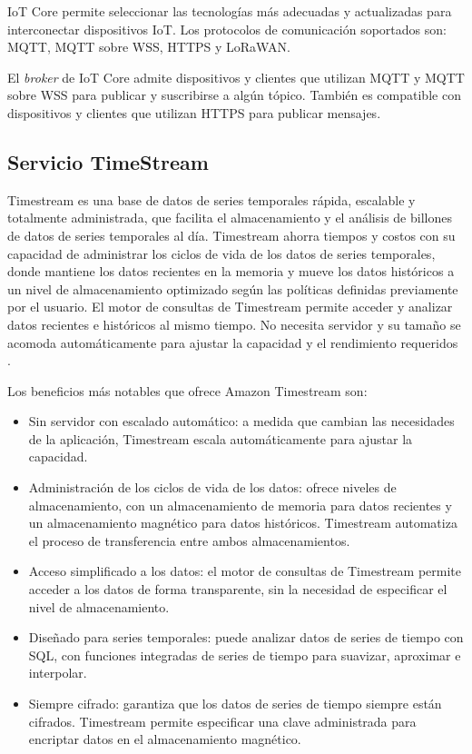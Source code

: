 IoT Core permite seleccionar las tecnologías más adecuadas y actualizadas para interconectar dispositivos IoT. Los protocolos de comunicación soportados son: MQTT, MQTT sobre WSS, HTTPS y LoRaWAN.

El \textit{broker} de IoT Core admite dispositivos y clientes que utilizan MQTT y MQTT sobre WSS para publicar y suscribirse a algún tópico. También es compatible con dispositivos y clientes que utilizan HTTPS para publicar mensajes.

\subsection{Servicio TimeStream}
Timestream es una base de datos de series temporales rápida, escalable y totalmente administrada, que facilita el almacenamiento y el análisis de billones de datos de series temporales al día. Timestream ahorra tiempos y costos con su capacidad de administrar los ciclos de vida de los datos de series temporales, donde mantiene los datos recientes en la memoria y mueve los datos históricos a un nivel de almacenamiento optimizado según las políticas definidas previamente por el usuario. El motor de consultas de Timestream permite acceder y analizar datos recientes e históricos al mismo tiempo. No necesita servidor y su tamaño se acomoda automáticamente para ajustar la capacidad y el rendimiento requeridos \cite{timestream_info}.

Los beneficios más notables que ofrece Amazon Timestream son:
\begin{itemize}
	\item Sin servidor con escalado automático: a medida que cambian las necesidades de la aplicación, Timestream escala automáticamente para ajustar la capacidad.
	\item Administración de los ciclos de vida de los datos: ofrece niveles de almacenamiento, con un almacenamiento de memoria para datos recientes y un almacenamiento magnético para datos históricos. Timestream automatiza el proceso de transferencia entre ambos almacenamientos.
	\item Acceso simplificado a los datos: el motor de consultas de Timestream permite acceder a los datos de forma transparente, sin la necesidad de especificar el nivel de almacenamiento.
	\item Diseñado para series temporales: puede analizar datos de series de tiempo con SQL, con funciones integradas de series de tiempo para suavizar, aproximar e interpolar.
	\item Siempre cifrado: garantiza que los datos de series de tiempo siempre están cifrados. Timestream permite especificar una clave administrada para encriptar datos en el almacenamiento magnético.
	
\end{itemize}


